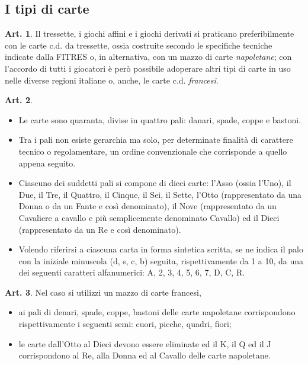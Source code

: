 \documentclass[italian,a4paper]{article}
\theoremstyle{definition}
\newtheorem{art}{Art.}
\newenvironment{packeditem}{
\begin{itemize}
  \setlength{\itemsep}{1pt}
  \setlength{\parskip}{0pt}
  \setlength{\parsep}{0pt}
}{\end{itemize}}
\begin{document}
\subsection{I tipi di carte}
\begin{art}
    Il tressette, i giochi affini e i giochi derivati  si praticano preferibilmente con le carte c.d. da tressette, ossia costruite secondo le specifiche tecniche indicate dalla FITRES o, in alternativa, con un mazzo di carte \emph{napoletane}; con l'accordo di tutti i giocatori è però possibile adoperare altri tipi di carte in uso nelle diverse regioni italiane o, anche, le carte c.d. \emph{francesi}.
\end{art}
\begin{art} \hspace*{\fill}
    \begin{packeditem}
\item Le carte sono quaranta, divise in quattro pali: danari, spade, coppe e bastoni.
\item Tra i pali non esiste gerarchia ma solo, per determinate finalità di carattere tecnico o regolamentare, un ordine convenzionale che corrisponde a quello appena seguito.
\item Ciascuno dei suddetti pali si compone di dieci carte: l'Asso (ossia l'Uno), il Due, il Tre, il Quattro, il Cinque, il Sei, il Sette, l'Otto (rappresentato da una Donna o da un Fante e così denominato), il Nove (rappresentato da un Cavaliere a  cavallo e più semplicemente denominato Cavallo) ed il Dieci (rappresentato da un Re e così denominato).
\item Volendo riferirsi a ciascuna carta in forma sintetica scritta, se ne
    indica il palo con la iniziale minuscola (d, s, c, b) seguita,
    rispettivamente da 1 a 10, da una dei seguenti caratteri alfanumerici: A, 2,
    3, 4, 5, 6, 7, D, C, R.
    \end{packeditem}
\end{art}
\begin{art}
    Nel caso si utilizzi un mazzo di carte francesi,
    \begin{packeditem}
\item   ai pali di denari, spade, coppe, bastoni delle carte napoletane corrispondono rispettivamente i seguenti semi: cuori, picche, quadri, fiori;
\item   le carte dall'Otto al Dieci devono essere eliminate ed il K, il Q ed il J corrispondono al Re, alla Donna ed al Cavallo delle carte napoletane.
    \end{packeditem}
\end{art}
\end{document}
